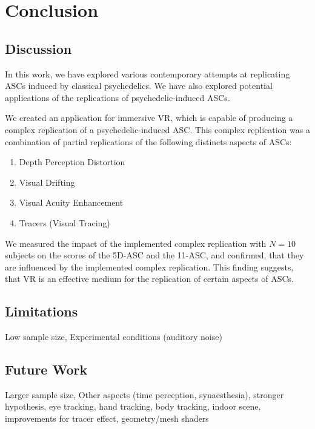 \chapter{Conclusion}
\section{Discussion}
In this work, we have explored various contemporary attempts at replicating \acfp{ASC} induced by classical psychedelics. We have also explored potential applications of the replications of psychedelic-induced \acp{ASC}.

We created an application for immersive \acf{VR}, which is capable of producing a complex replication of a psychedelic-induced \ac{ASC}. This complex replication was a combination of partial replications of the following distincts aspects of \acp{ASC}:

\begin{enumerate}
    \setlength{\itemsep}{0pt}
    \setlength{\parskip}{0pt}
    \item Depth Perception Distortion
    \item Visual Drifting
    \item Visual Acuity Enhancement
    \item Tracers (Visual Tracing)
\end{enumerate}

We measured the impact of the implemented complex replication with $N=10$ subjects on the scores of the \acf{5D-ASC} and the \acf{11-ASC}, and confirmed, that they are influenced by the implemented complex replication. This finding suggests, that \ac{VR} is an effective medium for the replication of certain aspects of \acp{ASC}.

\section{Limitations}
Low sample size, Experimental conditions (auditory noise)

\section{Future Work}
Larger sample size, Other aspects (time perception, synaesthesia), stronger hypothesis, eye tracking, hand tracking, body tracking, indoor scene, improvements for tracer effect, geometry/mesh shaders
